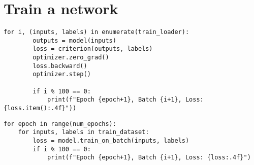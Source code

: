 \documentclass[24pt]{article}
\begin{document}
\section{Train a network}

\begin{multicols}{2}
\begin{lstlisting}
for i, (inputs, labels) in enumerate(train_loader):   
        outputs = model(inputs)
        loss = criterion(outputs, labels)
        optimizer.zero_grad()
        loss.backward()
        optimizer.step()   

        if i % 100 == 0:
            print(f"Epoch {epoch+1}, Batch {i+1}, Loss: {loss.item():.4f}"))\end{lstlisting}
\columnbreak

\begin{lstlisting}
for epoch in range(num_epochs):
    for inputs, labels in train_dataset:
        loss = model.train_on_batch(inputs, labels)
        if i % 100 == 0:
            print(f"Epoch {epoch+1}, Batch {i+1}, Loss: {loss:.4f}")
\end{lstlisting}
\end{multicols}  





\end{document}
